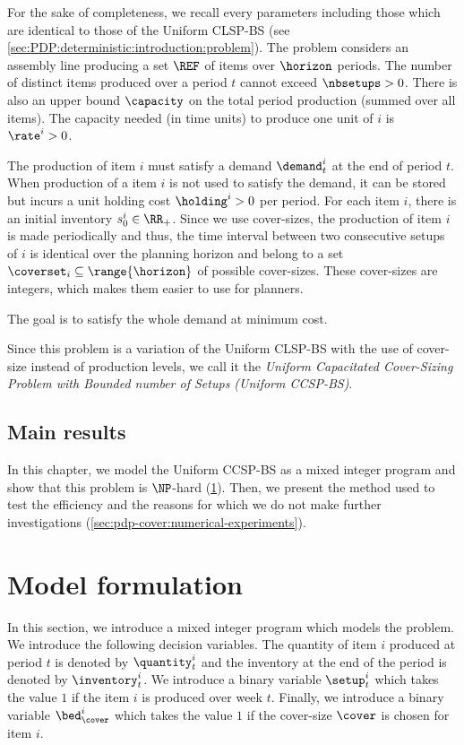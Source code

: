 For the sake of completeness, we recall every parameters including those which are identical to those of the Uniform CLSP-BS (see \cref{sec:PDP:deterministic:introduction:problem}).
The problem considers an assembly line producing a set $\REF$ of items over $\horizon$ periods.
The number of distinct items produced over a period $t$ cannot exceed $\nbsetups>0$.
There is also an upper bound $\capacity$ on the total period production (summed over all items).
The capacity needed (in time units) to produce one unit of $i$ is $\rate^i>0$.


The production of item $i$ must satisfy a demand $\demand_t^i$ at the end of period $t$.
When production of a item $i$ is not used to satisfy the demand, it can be stored but incurs a unit holding cost $\holding^i>0$ per period.
For each item $i$, there is an initial inventory $s_0^i\in\RR_+$.
Since we use cover-sizes, the production of item $i$ is made periodically and thus, the time interval between two consecutive setups of $i$ is identical over the planning horizon and belong to a set $\coverset_i\subseteq\range{\horizon}$ of possible cover-sizes.
These cover-sizes are integers, which makes them easier to use for planners.


The goal is to satisfy the whole demand at minimum cost.


Since this problem is a variation of the Uniform CLSP-BS with the use of cover-size instead of production levels, we call it the \emph{Uniform Capacitated Cover-Sizing Problem with Bounded number of Setups (Uniform CCSP-BS)}.


\subsection{Main results}


In this chapter, we model the Uniform CCSP-BS as a mixed integer program and show that this problem is $\NP$-hard (\cref{sec:pdp-cover:model-formulation}).
Then, we present the method used to test the efficiency and the reasons for which we do not make further investigations (\cref{sec:pdp-cover:numerical-experiments}).


\section{Model formulation}
\label{sec:pdp-cover:model-formulation}


In this section, we introduce a mixed integer program which models the problem.
We introduce the following decision variables.
The quantity of item $i$ produced at period $t$ is denoted by $\quantity_t^i$ and the inventory at the end of the period is denoted by $\inventory_t^i$.
We introduce a binary variable $\setup_t^i$ which takes the value $1$ if the item $i$ is produced over week $t$.
Finally, we introduce a binary variable $\bed_{\cover}^i$ which takes the value $1$ if the cover-size $\cover$ is chosen for item $i$.


